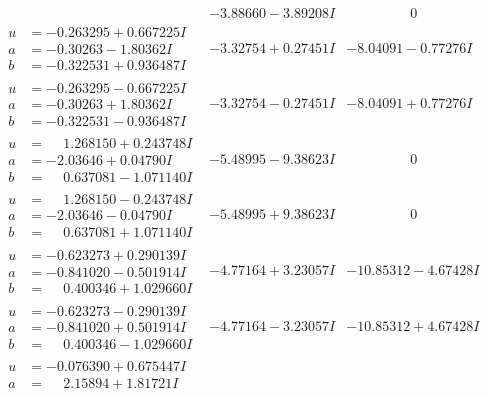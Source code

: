 \documentclass[1p]{elsarticle_modified}
\theoremstyle{definition}
\begin{document}
$$\begin{array}{c|c|c}
 & -3.88660 - 3.89208 I & \phantom{-0.000000 } 0 \\ \hline\begin{aligned}
u &= -0.263295 + 0.667225 I \\
a &= -0.30263 - 1.80362 I \\
b &= -0.322531 + 0.936487 I\end{aligned}
 & -3.32754 + 0.27451 I & -8.04091 - 0.77276 I \\ \hline\begin{aligned}
u &= -0.263295 - 0.667225 I \\
a &= -0.30263 + 1.80362 I \\
b &= -0.322531 - 0.936487 I\end{aligned}
 & -3.32754 - 0.27451 I & -8.04091 + 0.77276 I \\ \hline\begin{aligned}
u &= \phantom{-}1.268150 + 0.243748 I \\
a &= -2.03646 + 0.04790 I \\
b &= \phantom{-}0.637081 - 1.071140 I\end{aligned}
 & -5.48995 - 9.38623 I & \phantom{-0.000000 } 0 \\ \hline\begin{aligned}
u &= \phantom{-}1.268150 - 0.243748 I \\
a &= -2.03646 - 0.04790 I \\
b &= \phantom{-}0.637081 + 1.071140 I\end{aligned}
 & -5.48995 + 9.38623 I & \phantom{-0.000000 } 0 \\ \hline\begin{aligned}
u &= -0.623273 + 0.290139 I \\
a &= -0.841020 - 0.501914 I \\
b &= \phantom{-}0.400346 + 1.029660 I\end{aligned}
 & -4.77164 + 3.23057 I & -10.85312 - 4.67428 I \\ \hline\begin{aligned}
u &= -0.623273 - 0.290139 I \\
a &= -0.841020 + 0.501914 I \\
b &= \phantom{-}0.400346 - 1.029660 I\end{aligned}
 & -4.77164 - 3.23057 I & -10.85312 + 4.67428 I \\ \hline\begin{aligned}
u &= -0.076390 + 0.675447 I \\
a &= \phantom{-}2.15894 + 1.81721 I \\

\end{aligned}
\end{array}$$
\end{document}
